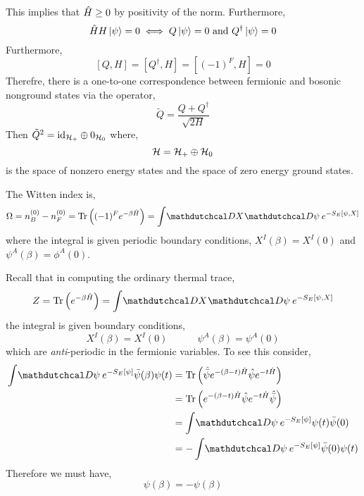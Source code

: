\documentclass[12pt]{extarticle}
\begin{document}
\begin{remark}
This implies that $\hat{H} \ge 0$ by positivity of the norm. Furthermore,
\[ \hat{H} H \left| \psi \right> = 0 \iff Q \left| \psi \right> = 0 \text{ and } Q^\dagger \left| \psi \right> = 0 \]
Furthermore,
\[ [Q, H] = [Q^\dagger, H] = [(-1)^F, H] = 0 \]
Therefre, there is a one-to-one correspondence between fermionic and bosonic nonground states via the operator,
\[ \tilde{Q} = \frac{Q + Q^\dagger}{\sqrt{2 H}} \]
Then $\tilde{Q}^2 = \mathrm{id}_{\mathcal{H}_{+}} \oplus 0_{\mathcal{H}_0}$ where,
\[ \mathcal{H} = \mathcal{H}_+ \oplus \mathcal{H}_0 \]
is the space of nonzero energy states and the space of zero energy ground states. 
\end{remark}

\begin{definition}
The Witten index is,
\[ \Omega = n_B^{(0)} - n_F^{(0)} = \Tr{(-1)^F e^{- \beta \hamilt}} = \int \pathd{X} \pathd{\psi} e^{-S_E[\psi, X]} \]
where the integral is given periodic boundary conditions, $X^I(\beta) = X^I(0)$ and $\psi^A(\beta) = \phi^A(0)$.  
\end{definition}

\begin{remark}
Recall that in computing the ordinary thermal trace,
\[ Z = \Tr{e^{-\beta \hamilt}} = \int \pathd{X} \pathd{\psi} e^{-S_E[\psi, X]} \]
the integral is given boundary conditions,
\[ X^I(\beta) = X^I(0) \quad \quad \quad \psi^A(\beta) = \psi^A(0) \]
which are \textit{anti}-periodic in the fermionic variables. To see this consider,
\begin{align*}
\int \pathd{\psi} e^{-S_E[\psi]} \bar{\psi}(\beta) \psi(t) & = \Tr{\hat{\bar{\psi}} e^{-(\beta - t) \hamilt} \hat{\psi} e^{-t \hamilt}}
\\
& = \Tr{e^{-(\beta - t) \hamilt} \hat{\psi} e^{-t \hamilt} \hat{\bar{\psi}}}
\\
& = \int \pathd{\psi} e^{-S_E[\psi]} \psi(t) \bar{\psi}(0)
\\
& = - \int \pathd{\psi} e^{-S_E[\psi]} \bar{\psi}(0) \psi(t) 
\end{align*}
Therefore we must have,
\[ \psi(\beta) = - \psi(\beta) \]
\end{remark}
\end{document}
